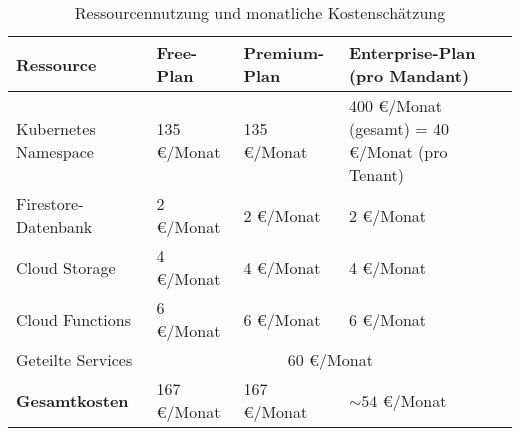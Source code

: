 \begin{table}[h!]
	\centering
	\caption{Ressourcennutzung und monatliche Kostenschätzung}
	{
		\begin{tabularx}{\textwidth}{|l|X|X|X|}
			\hline
			\textbf{Ressource}    & \textbf{Free-Plan}              & \textbf{Premium-Plan} & \textbf{Enterprise-Plan (pro Mandant)} \\ \hline
			Kubernetes Namespace  & 135 €/Monat                     & 135 €/Monat           & 400 €/Monat (gesamt) = 40 €/Monat (pro Tenant)                          \\ \hline
			Firestore-Datenbank   & 2 €/Monat                       & 2 €/Monat             & 2 €/Monat                              \\ \hline
			Cloud Storage         & 4 €/Monat                       & 4 €/Monat             & 4 €/Monat                              \\ \hline
			Cloud Functions       & 6 €/Monat                       & 6 €/Monat             & 6 €/Monat                              \\ \hline
			Geteilte Services     & \multicolumn{3}{c|}{60 €/Monat}                                                                  \\ \hline
			\textbf{Gesamtkosten} & 167 €/Monat                     & 167 €/Monat           & $\sim 54$ €/Monat                      \\ \hline
		\end{tabularx}}
	\label{tab:costmodel}
\end{table}
